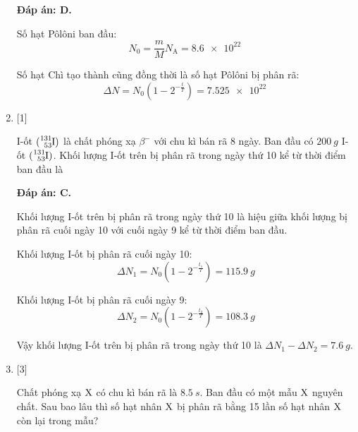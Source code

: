 \begin{enumerate}[label=\bfseries Câu \arabic*:]
	\loigiai
	{		\textbf{Đáp án: D.}
		
		Số hạt Pôlôni ban đầu:
		$$N_0 = \dfrac{m}{M} N_\text{A} = \SI{8.6e22}{}$$
		
		Số hạt Chì tạo thành cũng đồng thời là số hạt Pôlôni bị phân rã:
		$$\Delta N=N_0 (1-2 ^{-\frac{t}{T}} )= \SI{7.525e22}{}$$
		
	}
	
	\item {} [1]
	
	\cauhoi
	{I-ốt $(\ce{^131_53 I})$ là chất phóng xạ $\beta^-$ với chu kì bán rã 8 ngày. Ban đầu có $\SI{200}{g}$ I-ốt $(\ce{^131_53 I})$. Khối lượng I-ốt trên bị phân rã trong ngày thứ 10 kể từ thời điểm ban đầu là
	}
	
	\loigiai
	{		\textbf{Đáp án: C.}
		
		Khối lượng I-ốt trên bị phân rã trong ngày thứ 10 là hiệu giữa khối lượng bị phân rã cuối ngày 10 với cuối ngày 9 kể từ thời điểm ban đầu.
		
		Khối lượng I-ốt bị phân rã cuối ngày 10:
		$$\Delta N_1 = N_0 (1-2^{-\frac{t_1}{T}}) = \SI{115.9}{g}$$
		
		Khối lượng I-ốt bị phân rã cuối ngày 9:
		$$\Delta N_2 = N_0 (1-2^{-\frac{t_2}{T}}) = \SI{108.3}{g}$$
		
		Vậy khối lượng I-ốt trên bị phân rã trong ngày thứ 10 là $\Delta N_1 - \Delta N_2 = \SI{7.6}{g}$.
		
	}
	
	\item {} [3]
	
	\cauhoi
	{Chất phóng xạ $\ce{X}$ có chu kì bán rã là $\SI{8.5}{s}$. Ban đầu có một mẫu $\ce{X}$ nguyên chất. Sau bao lâu thì số hạt nhân $\ce{X}$ bị phân rã bằng 15 lần số hạt nhân $\ce{X}$ còn lại trong mẫu?
	}
	

\end{enumerate}
